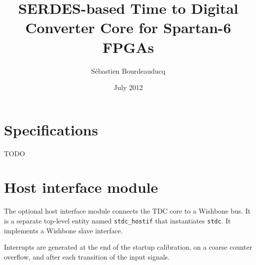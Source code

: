 \documentclass[a4paper,11pt]{article}
\title{SERDES-based Time to Digital Converter Core for Spartan-6 FPGAs}
\author{S\'ebastien Bourdeauducq}
\date{July 2012}
\begin{document}
\setlength{\parindent}{0pt}
\setlength{\parskip}{5pt}
\maketitle{}
\section{Specifications}
TODO

\section{Host interface module}
The optional host interface module connects the TDC core to a Wishbone bus. It is a separate top-level entity named \verb!stdc_hostif! that instantiates \verb!stdc!. It implements a Wishbone slave interface.

Interrupts are generated at the end of the startup calibration, on a coarse counter overflow, and after each transition of the input signals.
\end{document}
